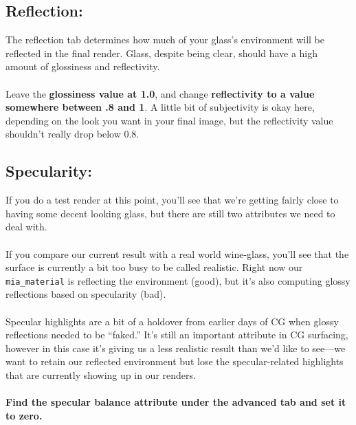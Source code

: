 \documentclass[10pt,a4paper]{article}
\begin{document}
\subsection{Reflection:}
The reflection tab determines how much of your glass's environment will be reflected in the final render. Glass, despite being clear, should have a high amount of glossiness and reflectivity.
\\
\\
Leave the \textbf{glossiness value at 1.0}, and change \textbf{reflectivity to a value somewhere between .8 and 1}. A little bit of subjectivity is okay here, depending on the look you want in your final image, but the reflectivity value shouldn't really drop below 0.8.

\subsection{Specularity:} 
If you do a test render at this point, you'll see that we're getting fairly close to having some decent looking glass, but there are still two attributes we need to deal with.
\\
\\
If you compare our current result with a real world wine-glass, you'll see that the surface is currently a bit too busy to be called realistic. Right now our \lstinline{mia_material} is reflecting the environment (good), but it's also computing glossy reflections based on specularity (bad).
\\
\\
Specular highlights are a bit of a holdover from earlier days of CG when glossy reflections needed to be “faked.” It's still an important attribute in CG surfacing, however in this case it's giving us a less realistic result than we'd like to see—we want to retain our reflected environment but lose the specular-related highlights that are currently showing up in our renders.
\\
\\
\textbf{Find the specular balance attribute under the advanced tab and set it to zero.}
\end{document}
